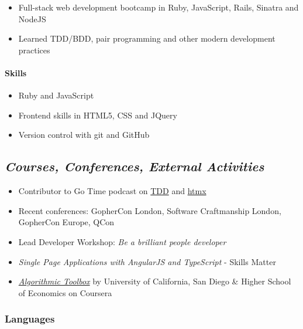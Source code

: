 \begin{itemize}
\tightlist
\item
  Full-stack web development bootcamp in Ruby, JavaScript, Rails,
  Sinatra and NodeJS
\item
  Learned TDD/BDD, pair programming and other modern development
  practices
\end{itemize}

\hypertarget{skills-2}{%
\paragraph{Skills}\label{skills-2}}

\begin{itemize}
\tightlist
\item
  Ruby and JavaScript
\item
  Frontend skills in HTML5, CSS and JQuery
\item
  Version control with git and GitHub
\end{itemize}

\hypertarget{courses-conferences-external-activities}{%
\subsection{\texorpdfstring{\emph{Courses, Conferences, External
Activities}}{Courses, Conferences, External Activities}}\label{courses-conferences-external-activities}}

\begin{itemize}
\tightlist
\item
  Contributor to Go Time podcast on
  \href{https://changelog.com/gotime/185}{TDD} and
  \href{https://changelog.com/gotime/266}{htmx}
\item
  Recent conferences: GopherCon London, Software Craftmanship London,
  GopherCon Europe, QCon
\item
  Lead Developer Workshop: \emph{Be a brilliant people developer}
\item
  \emph{Single Page Applications with AngularJS and TypeScript} - Skills
  Matter
\item
  \href{https://www.coursera.org/account/accomplishments/records/C58NGM7GQS84}{\emph{Algorithmic
  Toolbox}} by University of California, San Diego \& Higher School of
  Economics on Coursera
\end{itemize}

\hypertarget{languages}{%
\subsubsection{Languages}\label{languages}}

